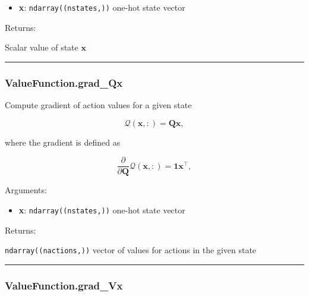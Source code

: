 \begin{itemize}
\tightlist
\item
  \textbf{x}: \texttt{ndarray((nstates,))} one-hot state vector
\end{itemize}

Returns:

Scalar value of state \(\mathbf x\)

\begin{center}\rule{0.5\linewidth}{\linethickness}\end{center}

\subsubsection{ValueFunction.grad\_Qx}\label{valuefunction.grad_qx}

\begin{Shaded}
\begin{Highlighting}[]
\end{Highlighting}
\end{Shaded}

Compute gradient of action values for a given state

\[
\mathcal Q(\mathbf x, :) = \mathbf Q \mathbf x,
\]

where the gradient is defined as

\[
\frac{\partial}{\partial \mathbf Q} \mathcal Q(\mathbf x, :) = \mathbf 1 \mathbf x^\top,
\]

Arguments:

\begin{itemize}
\tightlist
\item
  \textbf{x}: \texttt{ndarray((nstates,))} one-hot state vector
\end{itemize}

Returns:

\texttt{ndarray((nactions,))} vector of values for actions in the given
state

\begin{center}\rule{0.5\linewidth}{\linethickness}\end{center}

\subsubsection{ValueFunction.grad\_Vx}\label{valuefunction.grad_vx}

\begin{Shaded}
\begin{Highlighting}[]
\end{Highlighting}
\end{Shaded}

